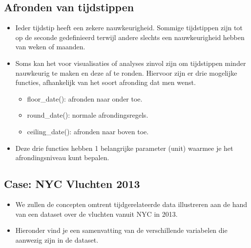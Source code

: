 \documentclass[]{memoir}
\providecommand{\tightlist}{%
  \setlength{\itemsep}{0pt}\setlength{\parskip}{0pt}}
\begin{document}
\hypertarget{afronden-van-tijdstippen}{%
\subsection{Afronden van tijdstippen}\label{afronden-van-tijdstippen}}

\begin{itemize}
\tightlist
\item
  Ieder tijdstip heeft een zekere nauwkeurigheid. Sommige tijdstippen zijn tot op de seconde gedefinieerd terwijl andere slechts een nauwkeurigheid hebben van weken of maanden.
\item
  Soms kan het voor visualisaties of analyses zinvol zijn om tijdstippen minder nauwkeurig te maken en deze af te ronden. Hiervoor zijn er drie mogelijke functies, afhankelijk van het soort afronding dat men wenst.

  \begin{itemize}
  \tightlist
  \item
    floor\_date(): afronden naar onder toe.
  \item
    round\_date(): normale afrondingsregels.
  \item
    ceiling\_date(): afronden naar boven toe.
  \end{itemize}
\item
  Deze drie functies hebben 1 belangrijke parameter (unit) waarmee je het afrondingsniveau kunt bepalen.
\end{itemize}

\hypertarget{case-nyc-vluchten-2013}{%
\subsection{Case: NYC Vluchten 2013}\label{case-nyc-vluchten-2013}}

\begin{itemize}
\tightlist
\item
  We zullen de concepten omtrent tijdgerelateerde data illustreren aan de hand van een dataset over de vluchten vanuit NYC in 2013.
\item
  Hieronder vind je een samenvatting van de verschillende variabelen die aanwezig zijn in de dataset.
\end{itemize}
\end{document}
